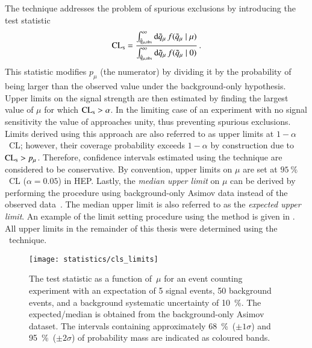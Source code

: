 The \CLs technique addresses the problem of spurious exclusions by introducing
the test statistic~\cite{Cowan:2010js}
\begin{align*}
  \text{CL}_{\text{s}} = \frac
  {\int_{\tilde{q}_{\mu, \text{obs}}}^{\infty} \mathrm{d}\tilde{q}_{\mu} \, f(\tilde{q}_{\mu} \mid \mu)}
  {\int_{\tilde{q}_{\mu, \text{obs}}}^\infty \mathrm{d}\tilde{q}_{\mu} \, f(\tilde{q}_{\mu} \mid 0)} \,\text{.}
\end{align*}
This statistic modifies $p_\mu$ (the numerator) by dividing it by the
probability of \qmutilde being larger than the observed value under the
background-only hypothesis. Upper limits on the signal strength are then
estimated by finding the largest value of $\mu$ for which $\text{CL}_{\text{s}} > \alpha$. In
the limiting case of an experiment with no signal sensitivity the value of \CLs
approaches unity, thus preventing spurious exclusions. Limits derived using this
approach are also referred to as upper limits at $1 - \alpha$~CL; however, their
coverage probability exceeds $1 - \alpha$ by construction due to $\text{CL}_{\text{s}} >
p_\mu$. Therefore, confidence intervals estimated using the \CLs technique are
considered to be conservative. By convention, upper limits on $\mu$ are set at
$\SI{95}{\percent}$~CL ($\alpha = 0.05$) in HEP. Lastly, the \emph{median upper
  limit} on $\mu$ can be derived by performing the procedure using
background-only Asimov data instead of the observed
data~\cite{Cowan:2010js}. The median upper limit is also referred to as the
\emph{expected upper limit}. An example of the limit setting procedure using the
\CLs method is given in . All upper limits in the
remainder of this thesis were determined using the \CLs~technique.

\begin{figure}[htbp]
  \centering

  \texttt{[image: statistics/cls\_limits]}

  \caption[The \CLs test statistic as a function of $\mu$ for an event counting
  experiment.]{The \CLs test statistic as a function of~$\mu$ for an event
    counting experiment with an expectation of 5 signal events, 50 background
    events, and a background systematic uncertainty of \SI{10}{\percent}. The
    expected/median \CLs is obtained from the background-only Asimov
    dataset. The \CLs intervals containing approximately
    \SI{68}{\percent}~($\pm 1 \sigma$) and \SI{95}{\percent}~($\pm 2 \sigma$) of
    probability mass are indicated as coloured bands.}%
  \label{fig:cls_example}
\end{figure}

